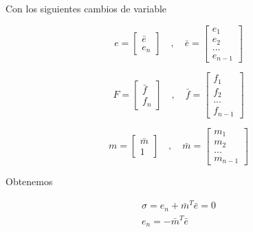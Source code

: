 \begin{flushright}
\end{flushright}

Con los siguientes cambios de variable

\begin{equation*}
    e=\begin{bmatrix}
        \bar{e} \\ e_n
    \end{bmatrix} \quad , \quad \bar{e}=\begin{bmatrix}
        e_1 \\ e_2 \\ ... \\ e_{n-1}
    \end{bmatrix}
\end{equation*}

\begin{equation*}
    F=\begin{bmatrix}
        \bar{f} \\ f_n
    \end{bmatrix}  \quad , \quad \bar{f}=\begin{bmatrix}
        f_1 \\ f_2 \\ ... \\ f_{n-1}
    \end{bmatrix}
\end{equation*}

\begin{equation*}
    m=\begin{bmatrix}
        \bar{m} \\ 1
    \end{bmatrix}  \quad , \quad \bar{m}=\begin{bmatrix}
        m_1 \\ m_2 \\ ... \\ m_{n-1}
    \end{bmatrix}
\end{equation*}

Obtenemos

\begin{equation*}
    \begin{aligned}
        \sigma=e_n+\bar{m}^T\bar{e}=0\\
        e_n=-\bar{m}^T\bar{e}
    \end{aligned}
\end{equation*}

